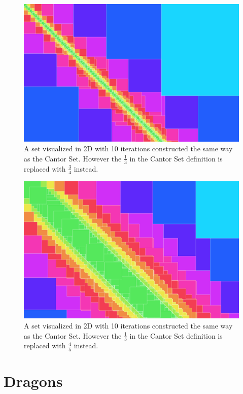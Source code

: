 \documentclass[11pt]{ekblite}
\begin{document}
	\begin{figure}[h]
		\includegraphics[scale=0.2]{img/c7.jpg}
		\caption{A set visualized in 2D with 10 iterations constructed the same way as the Cantor Set. However the $\frac{1}{3}$ in the Cantor Set definition is replaced with $\frac{3}{4}$ instead.}
	\end{figure}
	\begin{figure}[h]
		\includegraphics[scale=0.2]{img/c9.jpg}
		\caption{A set visualized in 2D with 10 iterations constructed the same way as the Cantor Set. However the $\frac{1}{3}$ in the Cantor Set definition is replaced with $\frac{4}{5}$ instead.}
	\end{figure}
\newpage
\section{Dragons}

\newpage

\end{document}
